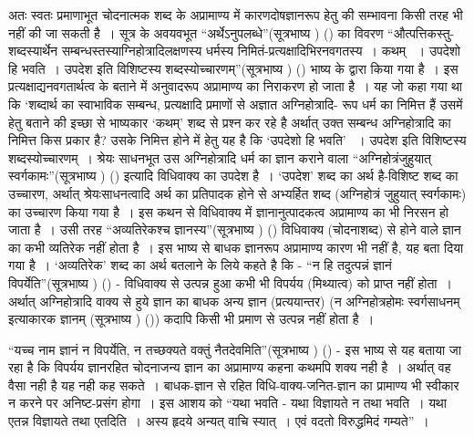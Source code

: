 अतः स्वतः प्रमाणाभूत चोदनात्मक शब्द के अप्रामाण्य में कारणदोषज्ञानरूप हेतु की सम्भावना किसी तरह भी नहीं की जा सकती है~। सूत्र के अवयवभूत “अर्थेऽनुपलब्धे”(सूत्रभाष्य ) () का विवरण “औत्पत्तिकस्तु-शब्दस्यार्थेन सम्बन्धस्तस्याग्निहोत्रादिलक्षणस्य धर्मस्य निमितं-प्रत्यक्षादिभिरनवगतस्य~। कथम् ~। उपदेशो हि भवति~। उपदेश इति विशिष्टस्य शब्दस्योच्चारणम्”(सूत्रभाष्य ) () भाष्य के द्वारा किया गया है~। इस प्रत्यक्षाद्यनवगतार्थत्व के बताने में अनुवादरूप अप्रामाण्य का निराकरण हो जाता है~। यह जो कहा गया था कि ‘शब्दार्थ का स्वाभाविक सम्बन्ध, प्रत्यक्षादि प्रमाणों से अज्ञात अग्निहोत्रादि- रूप धर्म का निमित्त हैं उसमें हेतु बताने की इच्छा से भाष्यकार ‘कथम्' शब्द से प्रश्न कर रहे है अर्थात् उक्त सम्बन्ध अग्निहोत्रादि का निमित्त किस प्रकार है? उसके निमित्त होने में हेतु यह है कि ‘उपदेशो हि भवति' ~। उपदेश इति विशिष्टस्य शब्दस्योच्चारणम्~। श्रेयः साधनभूत उस अग्निहोत्रादि धर्म का ज्ञान कराने वाला “अग्निहोत्रंजुहुयात् स्वर्गकामः”(सूत्रभाष्य ) () इत्यादि विधिवाक्य का उपदेश है~। ‘उपदेश' शब्द का अर्थ है-विशिष्ट शब्द का उच्चारण, अर्थात् श्रेयःसाधनत्वादि अर्थ का प्रतिपादक होने से अभ्यर्हित शब्द (अग्निहोत्रं जुहुयात् स्वर्गकामः) का उच्चारण किया गया है~। इस कथन से विधिवाक्य में ज्ञानानुत्पादकत्व अप्रामाण्य का भी निरसन हो जाता है~। उसी तरह “अव्यतिरेकश्च ज्ञानस्य”(सूत्रभाष्य ) () विधिवाक्य (चोदनाशब्द) से होने वाले ज्ञान का कभी व्यतिरेक नहीं होता है~। इस भाष्य से बाधक ज्ञानरूप अप्रामाण्य कारण भी नहीं है, यह बता दिया गया है~। ‘अव्यतिरेक' शब्द का अर्थ बतलाने के लिये कहते है कि - “न हि तदुत्पन्नं ज्ञानं विपर्येति”(सूत्रभाष्य ) () - विधिवाक्य से उत्पन्न हुआ कभी भी विपर्यय (मिथ्यात्व) को प्राप्त नहीं होता~। अर्थात् अग्निहोत्रादि वाक्य से हुये ज्ञान का बाधक अन्य ज्ञान (प्रत्ययान्तर) (न अग्निहोत्रहोमः स्वर्गसाधनम् इत्याकारक ज्ञानम् (सूत्रभाष्य ) ()) कदापि किसी भी प्रमाण से उत्पन्न नहीं होता है~। 

“यच्च नाम ज्ञानं न विपर्येति, न तच्छक्यते वक्तुं नैतदेवमिति”(सूत्रभाष्य ) () - इस भाष्य से यह बताया जा रहा है कि विपर्यय ज्ञानरहित चोदनाजन्य ज्ञान का अप्रामाण्य कहना कथमपि शक्य नही है~। अर्थात् वह वैसा नही है यह नही कह सकते~। बाधक-ज्ञान से रहित विधि-वाक्य-जनित-ज्ञान का प्रामाण्य भी स्वीकार न करने पर अनिष्ट-प्रसंग होगा~। इस आशय को “यथा भवति - यथा विज्ञायते न तथा भवति~। यथा एतन्न विज्ञायते तथा एतदिति~। अस्य हृदये अन्यत् वाचि स्यात्~। एवं वदतो विरुद्धमिदं गम्यते”~।

